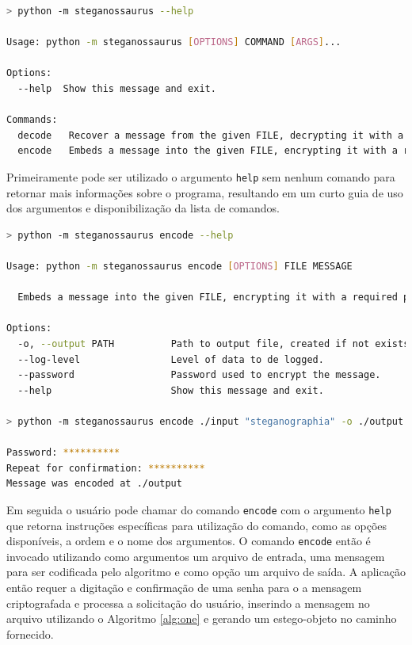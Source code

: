 \vspace{10mm}

\begin{lstlisting}[language=bash]
> python -m steganossaurus --help

Usage: python -m steganossaurus [OPTIONS] COMMAND [ARGS]...

Options:
  --help  Show this message and exit.

Commands:
  decode   Recover a message from the given FILE, decrypting it with a required password.
  encode   Embeds a message into the given FILE, encrypting it with a required password.
\end{lstlisting}

\vspace{10mm}

Primeiramente pode ser utilizado o argumento \texttt{\-\-help} sem nenhum comando para retornar mais informações sobre o programa, resultando em um curto guia de uso dos argumentos e disponibilização da lista de comandos.

\vspace{10mm}

\begin{lstlisting}[language=bash]
> python -m steganossaurus encode --help

Usage: python -m steganossaurus encode [OPTIONS] FILE MESSAGE

  Embeds a message into the given FILE, encrypting it with a required password.

Options:
  -o, --output PATH          Path to output file, created if not exists.
  --log-level                Level of data to de logged.
  --password                 Password used to encrypt the message.
  --help                     Show this message and exit.

> python -m steganossaurus encode ./input "steganographia" -o ./output

Password: **********
Repeat for confirmation: **********
Message was encoded at ./output
\end{lstlisting}

\vspace{10mm}

Em seguida o usuário pode chamar do comando \texttt{encode} com o argumento \texttt{\-\-help} que retorna instruções específicas para utilização do comando, como as opções disponíveis, a ordem e o nome dos argumentos. O comando \texttt{encode} então é invocado utilizando como argumentos um arquivo de entrada, uma mensagem para ser codificada pelo algoritmo e como opção um arquivo de saída. A aplicação então requer a digitação e confirmação de uma senha para o a mensagem criptografada e processa a solicitação do usuário, inserindo a mensagem no arquivo utilizando o Algoritmo \ref{alg:one} e gerando um estego-objeto no caminho fornecido.

